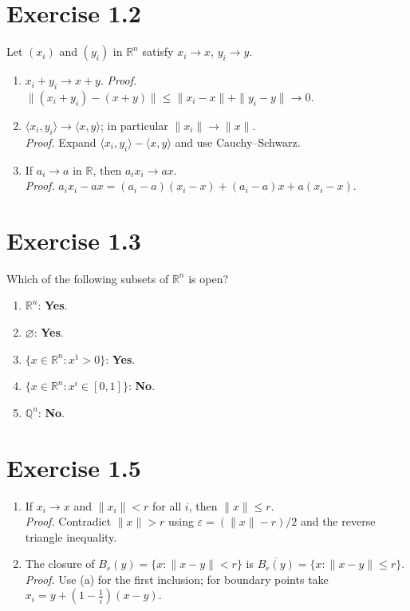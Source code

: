 \documentclass[11pt,a4paper]{article}
\begin{document}
\section*{Exercise 1.2}
Let $(x_i)$ and $(y_i)$ in $\mathbb{R}^n$ satisfy $x_i\to x$, $y_i\to y$.
\begin{enumerate}
\renewcommand\labelenumi{(\alph{enumi})}
\item $x_i+y_i\to x+y$. \textit{Proof.} $\|(x_i+y_i)-(x+y)\|\le \|x_i-x\|+\|y_i-y\|\to 0$.
\item $\langle x_i,y_i\rangle\to \langle x,y\rangle$; in particular $\|x_i\|\to \|x\|$.\\
\textit{Proof.} Expand $\langle x_i,y_i\rangle-\langle x,y\rangle$ and use Cauchy--Schwarz.
\item If $a_i\to a$ in $\mathbb{R}$, then $a_i x_i\to ax$.\\
\textit{Proof.} $a_ix_i-ax=(a_i-a)(x_i-x)+(a_i-a)x+a(x_i-x)$.
\end{enumerate}

\section*{Exercise 1.3}
Which of the following subsets of $\mathbb{R}^n$ is open?
\begin{enumerate}
\renewcommand\labelenumi{(\alph{enumi})}
\item $\mathbb{R}^n$: \textbf{Yes}.
\item $\varnothing$: \textbf{Yes}.
\item $\{x\in\mathbb{R}^n:x^1>0\}$: \textbf{Yes}.
\item $\{x\in\mathbb{R}^n:x^i\in[0,1]\}$: \textbf{No}.
\item $\mathbb{Q}^n$: \textbf{No}.
\end{enumerate}

\section*{Exercise 1.5}
\begin{enumerate}
\renewcommand\labelenumi{(\alph{enumi})}
\item If $x_i\to x$ and $\|x_i\|<r$ for all $i$, then $\|x\|\le r$.\\
\textit{Proof.} Contradict $\|x\|>r$ using $\varepsilon=(\|x\|-r)/2$ and the reverse triangle inequality.
\item The closure of $B_r(y)=\{x:\|x-y\|<r\}$ is $\overline{B_r(y)}=\{x:\|x-y\|\le r\}$.\\
\textit{Proof.} Use (a) for the first inclusion; for boundary points take $x_i=y+(1-\tfrac1i)(x-y)$.
\end{enumerate}
\end{document}

